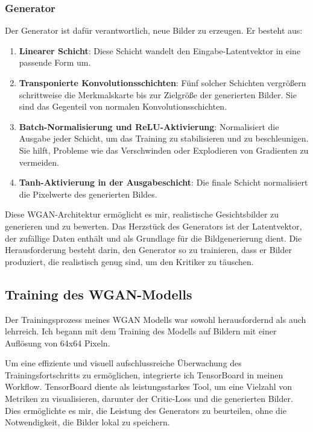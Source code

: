 \documentclass[a4paper, 12pt]{article}
\begin{document}
\subsubsection{Generator}

Der Generator ist dafür verantwortlich, neue Bilder zu erzeugen. Er besteht aus:

\begin{enumerate}
    \item \textbf{Linearer Schicht}: Diese Schicht wandelt den Eingabe-Latentvektor in eine passende Form um.
    \item \textbf{Transponierte Konvolutionsschichten}: Fünf solcher Schichten vergrößern schrittweise die Merkmalskarte bis zur Zielgröße der generierten Bilder. Sie sind das Gegenteil von normalen Konvolutionsschichten.
    \item \textbf{Batch-Normalisierung und ReLU-Aktivierung}: Normalisiert die Ausgabe jeder Schicht, um das Training zu stabilisieren und zu beschleunigen. Sie hilft, Probleme wie das Verschwinden oder Explodieren von Gradienten zu vermeiden.
    \item \textbf{Tanh-Aktivierung in der Ausgabeschicht}: Die finale Schicht normalisiert die Pixelwerte des generierten Bildes.
\end{enumerate}

Diese WGAN-Architektur ermöglicht es mir, realistische Gesichtsbilder zu generieren und zu bewerten. Das Herzstück des Generators ist der Latentvektor, der zufällige Daten enthält und als Grundlage für die Bildgenerierung dient. Die Herausforderung besteht darin, den Generator so zu trainieren, dass er Bilder produziert, die realistisch genug sind, um den Kritiker zu täuschen.


\subsection{Training des WGAN-Modells}
Der Trainingsprozess meines WGAN Modells war sowohl herausfordernd als auch lehrreich. Ich begann mit dem Training des Modells auf Bildern mit einer Auflösung von 64x64 Pixeln.

Um eine effiziente und visuell aufschlussreiche Überwachung des Trainingsfortschritts zu ermöglichen, integrierte ich TensorBoard in meinen Workflow. TensorBoard diente als leistungsstarkes Tool, um eine Vielzahl von Metriken zu visualisieren, darunter der Critic-Loss und die generierten Bilder. Dies ermöglichte es mir, die Leistung des Generators zu beurteilen, ohne die Notwendigkeit, die Bilder lokal zu speichern.
\end{document}
